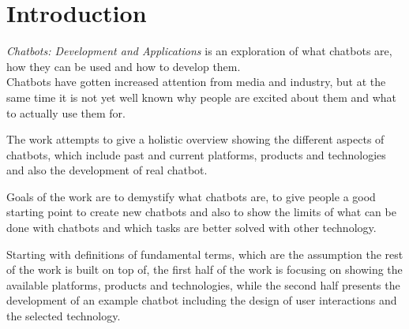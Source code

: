 \chapter{Introduction}


\emph{Chatbots: Development and Applications} is an exploration of what chatbots are, how they can be used and how to develop them.
\\

Chatbots have gotten increased attention from media and industry,
but at the same time it is not yet well known why people are excited about them
and what to actually use them for.

The work attempts to give a holistic overview showing the different aspects of chatbots,
which include past and current platforms, products and technologies
and also the development of real chatbot.

Goals of the work are to demystify what chatbots are,
to give people a good starting point to create new chatbots
and also to show the limits of what can be done with chatbots and which tasks are better solved with other technology.

Starting with definitions of fundamental terms, which are the assumption the rest of the work is built on top of,
the first half of the work is focusing on showing the available platforms, products and technologies,
while the second half presents the development of an example chatbot including the design of user interactions and the selected technology.
